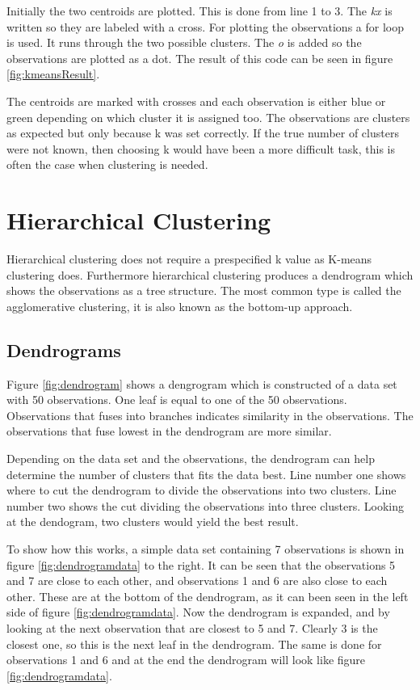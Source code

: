 Initially the two centroids are plotted. This is done from line 1 to 3. The \emph{kx} is written so they are labeled with a cross. For plotting the observations a for loop is used. It runs through the two possible clusters. The \emph{o} is added so the observations are plotted as a dot. 
The result of this code can be seen in figure \ref{fig:kmeansResult}.


The centroids are marked with crosses and each observation is either blue or green depending on which cluster it is assigned too. The observations are clusters as expected but only because k was set correctly. If the true number of clusters were not known, then choosing k would have been a more difficult task, this is often the case when clustering is needed.


\section{Hierarchical Clustering}
Hierarchical clustering does not require a prespecified k value as K-means clustering does.
Furthermore hierarchical clustering produces a dendrogram which shows the observations as a tree structure.
The most common type is called the agglomerative clustering, it is also known as the bottom-up approach.

\subsection{Dendrograms}
Figure \ref{fig:dendrogram} shows a dengrogram which is constructed of a data set with 50 observations.
One leaf is equal to one of the 50 observations. Observations that fuses into branches indicates similarity in the observations. The observations that fuse lowest in the dendrogram are more similar.

Depending on the data set and the observations, the dendrogram can help determine the number of clusters that fits the data best. Line number one shows where to cut the dendrogram to divide the observations into two clusters. Line number two shows the cut dividing the observations into three clusters. Looking at the dendogram, two clusters would yield the best result.



\FloatBarrier
To show how this works, a simple data set containing 7 observations is shown in figure \ref{fig:dendrogramdata} to the right.
It can be seen that the observations 5 and 7 are close to each other, and observations 1 and 6 are also close to each other. These are at the bottom of the dendrogram, as it can been seen in the left side of figure \ref{fig:dendrogramdata}. Now the dendrogram is expanded, and by looking at the next observation that are closest to 5 and 7. Clearly 3 is the closest one, so this is the next leaf in the dendrogram. The same is done for observations 1 and 6 and at the end the dendrogram will look like figure \ref{fig:dendrogramdata}.

